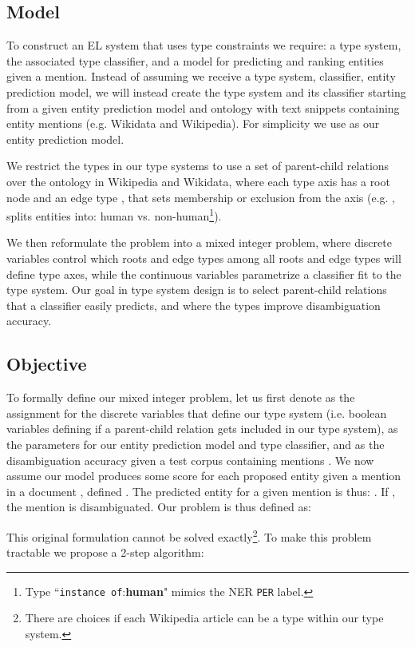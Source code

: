 \documentclass[letterpaper]{article}
\begin{document}
\subsection{Model}



To construct an EL system that uses type constraints we require: a type system, the associated type classifier, and a model for predicting and ranking entities given a mention.
Instead of assuming we receive a type system, classifier, entity prediction model, we will instead create the type system and its classifier starting from a given entity prediction model and ontology with text snippets containing entity mentions (e.g. Wikidata and Wikipedia). For simplicity we use  as our entity prediction model.

We restrict the types in our type systems to use a set of parent-child relations over the ontology in Wikipedia and Wikidata, where each type axis has a root node  and an edge type , that sets membership or exclusion from the axis (e.g. , splits entities into: human vs. non-human\footnote{Type ``\texttt{instance of}:\textbf{human}" mimics the NER  \texttt{PER} label.}).

We then reformulate the problem into a mixed integer problem, where discrete variables control which roots  and edge types   among all roots  and edge types  will define type axes, while the continuous variables  parametrize a classifier fit to the type system.
Our goal in type system design is to select parent-child relations that a classifier easily predicts, and where the types improve disambiguation accuracy.

\subsection{Objective}
To formally define our mixed integer problem, let us first denote  as the assignment for the discrete variables that define our type system (i.e. boolean variables defining if a parent-child relation gets included in our type system),  as the parameters for our entity prediction model and type classifier, and  as the disambiguation accuracy given a test corpus containing mentions . We now assume our model produces some score for each proposed entity  given a mention  in a document , defined . The predicted entity for a given mention is thus: . If , the mention is disambiguated. Our problem is thus defined as:




This original formulation cannot be solved exactly\footnote{There are  choices if each Wikipedia article can be a type within our type system.}. To make this problem tractable we propose a 2-step algorithm:
\end{document}
